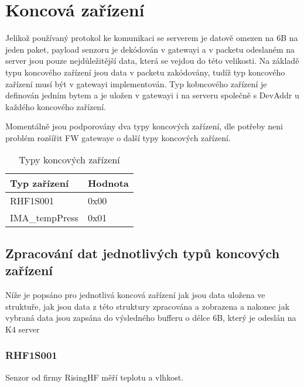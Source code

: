 \newpage
\section{Koncová zařízení}
Jelikož používaný protokol ke komunikaci se serverem je datově omezen na 6B na jeden paket, payload senzoru je dekódován v gatewayi a v packetu odeslaném na server jsou pouze nejdůležitější data, která se vejdou do této velikosti.
Na základě typu koncového zařízení jsou data v packetu zakódovány, tudíž typ koncového zařízení musí být v gatewayi implementován.
Typ kobncového zařízení je definován jedním bytem a je uložen v gatewayi i na serveru společně s DevAddr u každého koncového zařízení.

Momentálně jsou podporovány dva typy koncových zařízení, dle potřeby neni problém rozšířit FW gatewaye o další typy koncových zařízení.

\begin{table}[!h]
    \centering
    \begin{tabular}{ |l|l| }
     \hline

     Typ zařízení       & Hodnota         \\ \hline \hline
     RHF1S001           & 0x00            \\ \hline
     IMA\_tempPress     & 0x01            \\ \hline
     
    \end{tabular}
    \caption{Typy koncových zařízení}
    \label{table:TypyKoncZarizeni}
\end{table}

\subsection{Zpracování dat jednotlivých typů koncových zařízení}
Níže je popsáno pro jednotlivá koncová zařízení jak jsou data uložena ve struktuře, jak jsou data z této struktury zpracována a zobrazena a nakonec jak vybraná data jsou zapsána do výsledného bufferu o délce 6B, který je odeslán na K4 server

\subsubsection{RHF1S001}
Senzor od firmy RisingHF měří teplotu a vlhkost.

